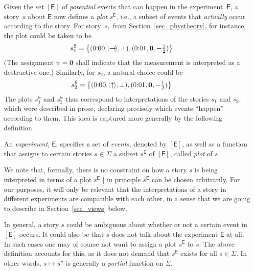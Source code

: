 \documentclass[12pt]{article}
\theoremstyle{plain}
\theoremstyle{definition}
\newcommand*{\ket}[1]{{| #1 \rangle}}
\newcommand*{\Exp}{\mathsf{E}}
\newcommand*{\spinup}{\ket{{\hspace{-0.1ex}\uparrow\hspace{-0.1ex}}}}
\newcommand*{\spinright}{\ket{{\hspace{-0.2ex}\rightarrow\hspace{-0.4ex}}}}
\newcommand*{\sminus}{{\textstyle - \frac{1}{2}}}
\begin{document}
Given the set $[\Exp]$ of \emph{potential} events that can happen in the experiment~$\Exp$, a story~$s$ about $\Exp$ now defines a \emph{plot} $s^{\Exp}$, i.e., a subset of events that \emph{actually} occur according to the story. For story~$s_1$ from Section~\ref{sec_phystheory}, for instance, the plot could be taken to be
\begin{align*}
 s_1^{\Exp} & =  \bigl\{ (\text{0:00}, \spinright, \bot),  (\text{0:01}, \mathbf{0},  \sminus) \bigr\} \ .
 \end{align*}
 (The assignment $\psi = \mathbf{0}$ shall indicate that the measurement is interpreted as a destructive one.)  Similarly, for $s_2$, a natural choice could be
 \begin{align*}
  s_2^{\Exp} & = \bigl\{ (\text{0:00}, \spinup, \bot),  (\text{0:01}, \mathbf{0},  \sminus) \bigr\} \ .
\end{align*}
The plots $s_1^{\Exp}$ and $s_2^{\Exp}$ thus correspond to interpretations of the stories $s_1$ and $s_2$, which were described in prose, declaring precisely which events ``happen'' according to them. This idea is captured more generally by the following definition.

\begin{shaded}
  \noindent An \emph{experiment}, $\Exp$, specifies a set of \emph{events}, denoted by $[\Exp]$, as well as a function that assigns to certain stories $s \in \Sigma$ a subset $s^\Exp$ of $[\Exp]$,  called \emph{plot} of $s$. 
\end{shaded}

We note that, formally, there is no constraint on how a story $s$ is being interpreted in terms of a plot $s^\Exp$ | in principle $s^\Exp$ can be chosen arbitrarily. For our purposes, it will only be relevant that the interpretations of a story in different experiments are compatible with each other, in a sense that we are going to describe in Section~\ref{sec_views} below. 

In general, a story $s$ could be ambiguous about whether or not a certain event in $[\Exp]$ occurs. It could also be that $s$ does not talk about the experiment $\Exp$ at all.  In such cases one may of course not want to assign a plot $s^{\Exp}$ to $s$. The above definition accounts for this, as it does not demand that  $s^{\Exp}$ exists for all $s \in \Sigma$.  In other words,  $s \mapsto s^{\Exp}$ is generally a \emph{partial} function on $\Sigma$.
\end{document}
